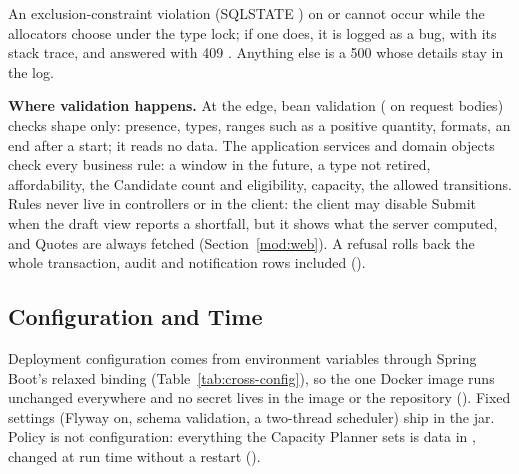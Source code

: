 An exclusion-constraint violation (SQLSTATE ) on  or  cannot occur while the allocators choose under the type lock; if one does, it is logged as a bug, with its stack trace, and answered with 409 . Anything else is a 500 whose details stay in the log.

\textbf{Where validation happens.} At the edge, bean validation ( on request bodies) checks shape only: presence, types, ranges such as a positive quantity, formats, an end after a start; it reads no data. The application services and domain objects check every business rule: a window in the future, a type not retired, affordability, the Candidate count and eligibility, capacity, the allowed transitions. Rules never live in controllers or in the client: the client may disable Submit when the draft view reports a shortfall, but it shows what the server computed, and Quotes are always fetched (Section~\ref{mod:web}). A refusal rolls back the whole transaction, audit and notification rows included ().

\subsection{Configuration and Time}

Deployment configuration comes from environment variables through Spring Boot's relaxed binding (Table~\ref{tab:cross-config}), so the one Docker image runs unchanged everywhere and no secret lives in the image or the repository (). Fixed settings (Flyway on, schema validation, a two-thread scheduler) ship in the jar. Policy is not configuration: everything the Capacity Planner sets is data in , changed at run time without a restart ().


